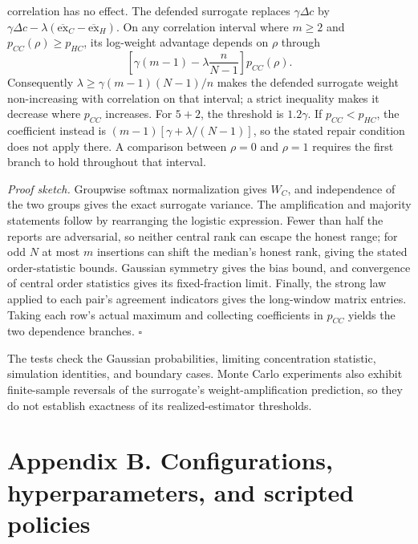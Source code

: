 \documentclass[
  12pt,
]{article}
\begin{document}
\begin{enumerate}
  correlation has no effect. The defended surrogate replaces
  \(\gamma\Delta c\) by
  \(\gamma\Delta c-\lambda(\overline{\mathrm{ex}}_C-\overline{\mathrm{ex}}_H)\).
  On any correlation interval where \(m\ge2\) and
  \(p_{CC}(\rho)\ge p_{HC}\), its log-weight advantage depends on
  \(\rho\) through \[
  \left[\gamma(m-1)-\lambda\frac{n}{N-1}\right]p_{CC}(\rho).
  \] Consequently \(\lambda\ge\gamma(m-1)(N-1)/n\) makes the defended
  surrogate weight non-increasing with correlation on that interval; a
  strict inequality makes it decrease where \(p_{CC}\) increases. For
  \(5+2\), the threshold is \(1.2\gamma\). If \(p_{CC}<p_{HC}\), the
  coefficient instead is \((m-1)[\gamma+\lambda/(N-1)]\), so the stated
  repair condition does not apply there. A comparison between \(\rho=0\)
  and \(\rho=1\) requires the first branch to hold throughout that
  interval.
\end{enumerate}

\emph{Proof sketch.} Groupwise softmax normalization gives \(W_C\), and
independence of the two groups gives the exact surrogate variance. The
amplification and majority statements follow by rearranging the logistic
expression. Fewer than half the reports are adversarial, so neither
central rank can escape the honest range; for odd \(N\) at most \(m\)
insertions can shift the median's honest rank, giving the stated
order-statistic bounds. Gaussian symmetry gives the bias bound, and
convergence of central order statistics gives its fixed-fraction limit.
Finally, the strong law applied to each pair's agreement indicators
gives the long-window matrix entries. Taking each row's actual maximum
and collecting coefficients in \(p_{CC}\) yields the two dependence
branches. \(\square\)

The tests check the Gaussian probabilities, limiting concentration
statistic, simulation identities, and boundary cases. Monte Carlo
experiments also exhibit finite-sample reversals of the surrogate's
weight-amplification prediction, so they do not establish exactness of
its realized-estimator thresholds.

\FloatBarrier

\clearpage

\section*{Appendix B. Configurations, hyperparameters, and scripted
policies}\label{appendix-b.-configurations-hyperparameters-and-scripted-policies}
\end{document}
